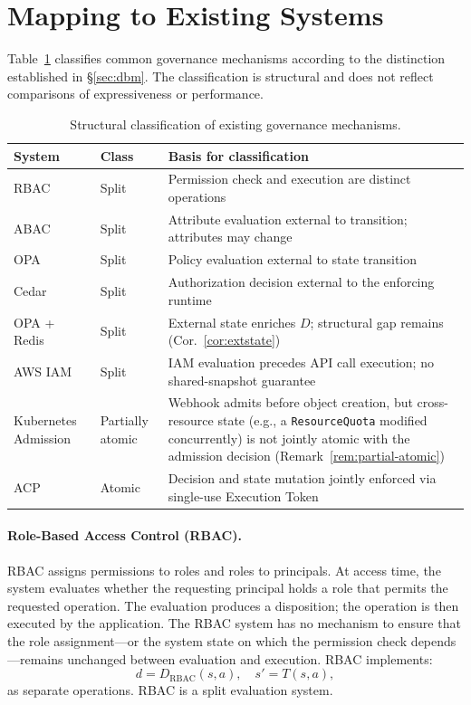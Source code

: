 \documentclass[11pt]{article}
\theoremstyle{plain}
\theoremstyle{definition}
\theoremstyle{remark}
\begin{document}
\section{Mapping to Existing Systems}
\label{sec:mapping}

Table~\ref{tab:mapping} classifies common governance mechanisms according to
the distinction established in \S\ref{sec:dbm}.  The classification is
structural and does not reflect comparisons of expressiveness or performance.

\begin{table}[h]
\centering
\caption{Structural classification of existing governance mechanisms.}
\label{tab:mapping}
\begin{tabular}{llp{6.8cm}}
\toprule
\textbf{System} & \textbf{Class} & \textbf{Basis for classification} \\
\midrule
RBAC~\cite{sandhu96}
  & Split
  & Permission check and execution are distinct operations \\[2pt]
ABAC~\cite{hru76}
  & Split
  & Attribute evaluation external to transition; attributes may change \\[2pt]
OPA~\cite{opa}
  & Split
  & Policy evaluation external to state transition \\[2pt]
Cedar~\cite{cedar}
  & Split
  & Authorization decision external to the enforcing runtime \\[2pt]
OPA + Redis
  & Split
  & External state enriches $D$; structural gap remains
    (Cor.~\ref{cor:extstate}) \\[2pt]
AWS IAM
  & Split
  & IAM evaluation precedes API call execution; no shared-snapshot
    guarantee \\[2pt]
Kubernetes Admission
  & Partially atomic
  & Webhook admits before object creation, but cross-resource state
    (e.g., a \texttt{ResourceQuota} modified concurrently) is not
    jointly atomic with the admission decision
    (Remark~\ref{rem:partial-atomic}) \\[2pt]
ACP~\cite{acp26}
  & Atomic
  & Decision and state mutation jointly enforced via single-use
    Execution Token \\
\bottomrule
\end{tabular}
\end{table}

\paragraph{Role-Based Access Control (RBAC).}
RBAC assigns permissions to roles and roles to principals.  At access time,
the system evaluates whether the requesting principal holds a role that
permits the requested operation.  The evaluation produces a disposition;
the operation is then executed by the application.  The RBAC system has no
mechanism to ensure that the role assignment---or the system state on which
the permission check depends---remains unchanged between evaluation and
execution.  RBAC implements:
\[
  d = D_{\mathrm{RBAC}}(s, a), \quad s' = T(s, a),
\]
as separate operations. RBAC is a split evaluation system.
\end{document}
